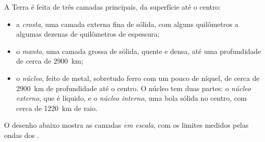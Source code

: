 \begin{definition}\label{def:g6:inside-the-earth:layers}
A Terra é feita de três camadas principais, da superfície até o centro:
\begin{itemize}
  \item a \emph{crosta}, uma camada externa fina de 
        sólida, com alguns quilômetros a algumas dezenas de quilômetros de
        espessura;
  \item o \emph{manto}, uma camada grossa de  sólida,
        quente e densa, até uma profundidade de cerca de 2900~km;
  \item o \emph{núcleo}, feito de metal, sobretudo ferro com
        um pouco de níquel, de cerca de 2900~km de profundidade até o
        centro. O núcleo tem duas partes: o \emph{núcleo externo},
        que é líquido, e o \emph{núcleo interno}, uma
        bola sólida no centro, com cerca de 1220~km de raio.
\end{itemize}
\end{definition}

O desenho abaixo mostra as camadas \emph{em escala}, com os limites
medidos pelas ondas dos .

